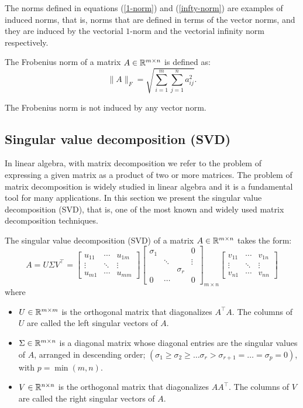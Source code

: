 
The norms defined in equations (\ref{1-norm}) and (\ref{infty-norm}) are examples of induced norms, that is, norms that are defined in terms of the vector norms, and they are induced by the vectorial $1$-norm and the vectorial infinity norm respectively.
\begin{example}
    The Frobenius norm of a matrix $A \in \mathbb{R}^{m \times n}$ is defined as:
    \begin{equation}
    \| A \|_F = \sqrt{\sum_{i=1}^{m} \sum_{j=1}^{n} a_{ij}^2}.
    \end{equation}
\end{example}
The Frobenius norm is not induced by any vector norm.
\subsection{Singular value decomposition (SVD)}\label{matrix decomposition section}
In linear algebra, with matrix decomposition we refer to the problem of expressing a given matrix as a product of two or more matrices.
The problem of matrix decomposition is widely studied in linear algebra and it is a fundamental tool for many applications.
In this section we present the singular value decomposition (SVD), that is, one of the most known and widely used matrix decomposition techniques.
\par
The singular value decomposition (SVD) of a matrix $A \in \mathbb{R}^{m \times n}$ takes the form:
\begin{equation}
    A = U \Sigma V^\top = 
\begin{bmatrix}u_{11}&\cdots&u_{1m}\\\vdots&\ddots&\vdots\\u_{m1}&\cdots&u_{mm}\end{bmatrix}
\begin{bmatrix}
\sigma_1 & & & 0\\
& \ddots & & \vdots\\
& & \sigma_r & \\
0 & \cdots & & 0
\end{bmatrix}_{m\times n}
\begin{bmatrix}v_{11}&\cdots&v_{1n}\\\vdots&\ddots&\vdots\\v_{n1}&\cdots&v_{nn}\end{bmatrix}
\end{equation}
where \begin{itemize}
    \item $U \in \mathbb{R}^{m \times m}$ is the orthogonal matrix that diagonalizes $A^\top A$. The columns of $U$ are called the left singular vectors of $A$.
    \item $\Sigma \in \mathbb{R}^{m \times n}$ is a diagonal matrix whose diagonal entries are the singular values of $A$, arranged in descending order; $(\sigma_1 \geq \sigma_2\geq\dots\sigma_r>\sigma_{r+1}=\dots=\sigma_p = 0)$, with $p = \min(m,n)$.
    \item $V \in \mathbb{R}^{n \times n}$ is the orthogonal matrix that diagonalizes $AA^\top$. The columns of $V$ are called the right singular vectors of $A$.
\end{itemize}
